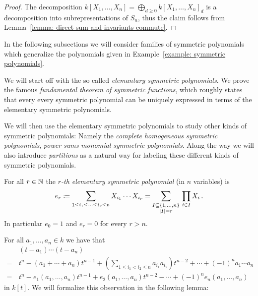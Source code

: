 \begin{proof}
  The decomposition $k[X_1, \dotsc, X_n] = \bigoplus_{d \geq 0} k[X_1, \dotsc, X_n]_d$ is a decomposition into subrepresentations of $S_n$, thus the claim follows from Lemma~\ref{lemma: direct sum and invariants commute}.
\end{proof}

\begin{fluff}
  In the following subsections we will consider families of symmetric polynomials which generalize the polynomials given in Example~\ref{example: symmetric polynomials}.
  
  We will start off with the so called \emph{elemantary symmetric polynomials}.
  We prove the famous \emph{fundamental theorem of symmetric functions}, which roughly states that every every symmetric polynomial can be uniquely expressed in terms of the elementary symmetric polynomials.
  
  We will then use the elementary symmetric polynomials to study other kinds of symmetric polynomials:
  Namely the \emph{complete homogeneous symmetric polynomials}, \emph{power sums} \emph{monomial symmetric polynomials}.
  Along the way we will also introduce \emph{partitions} as a natural way for labeling these different kinds of symmetric polynomials.
\end{fluff}


\begin{definition}
  For all $r \in \mathbb{N}$ the \emph{$r$-th elementary symmetric polynomial} (in $n$ variables) is
  \[
              e_r
    \coloneqq  \sum_{1 \leq i_1 \leq \dotsb \leq i_r \leq n} X_{i_1} \dotsm X_{i_r}
    =         \sum_{\substack{I \subseteq \{1, \dotsc, n\} \\ |I| = r}} \, \prod_{i \in I} X_i \,.
  \]
  In particular $e_0 = 1$ and $e_r = 0$ for every $r > n$.
\end{definition}


\begin{fluff}
  For all $a_1, \dotsc, a_n \in k$ we have that
  \begin{align*}
     &\, (t-a_1) \dotsm (t-a_n) \\
    =&\, t^n  - (a_1 + \dotsb + a_n) t^{n-1}
              + \left( \sum_{1 \leq i_1 < i_2 \leq n} a_{i_1} a_{i_2} \right) t^{n-2}
              + \dotsb
              + (-1)^n a_1 \dotsm a_n \\ 
    =&\,    t^n
          - e_1(a_1, \dotsc, a_n) t^{n-1}
          + e_2(a_1, \dotsc, a_n) t^{n-2}
          - \dotsb
          + (-1)^n e_n(a_1, \dotsc, a_n)
  \end{align*}
  in $k[t]$.
  We will formalize this observation in the following lemma:
\end{fluff}


